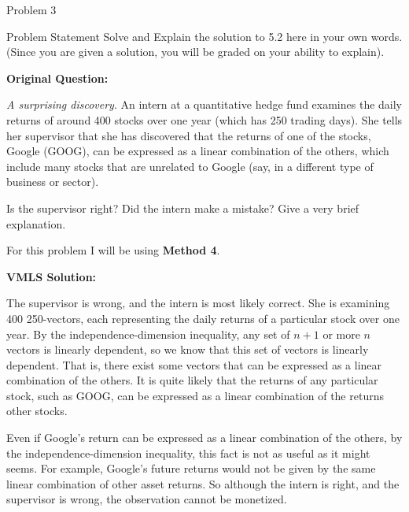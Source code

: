 \begin{problem}{Problem 3}
    \begin{statement}{Problem Statement}
        Solve and Explain the solution to 5.2 here in your own words. (Since you are given a solution, you will be graded on your ability to explain). \vspace*{1em}

        \textbf{Original Question:} \vspace*{1em}

        \textit{A surprising discovery}. An intern at a quantitative hedge fund examines the daily returns of around 400 stocks over one year (which has 250 trading days). She tells her supervisor that 
        she has discovered that the returns of one of the stocks, Google (GOOG), can be expressed as a linear combination of the others, which include many stocks that are unrelated to Google (say, in a 
        different type of business or sector).

        Is the supervisor right? Did the intern make a mistake? Give a very brief explanation.
    \end{statement}

    \begin{highlight}[Solution]
        For this problem I will be using \textbf{Method 4}. \vspace*{1em}

        \textbf{VMLS Solution:} \vspace*{1em}

        The supervisor is wrong, and the intern is most likely correct. She is examining 400 250-vectors, each representing the daily returns of a particular stock over one year. By the independence-dimension 
        inequality, any set of $n + 1$ or more $n$ vectors is linearly dependent, so we know that this set of vectors is linearly dependent. That is, there exist some vectors that can be expressed as a linear 
        combination of the others. It is quite likely that the returns of any particular stock, such as GOOG, can be expressed as a linear combination of the returns other stocks.

        Even if Google’s return can be expressed as a linear combination of the others, by the independence-dimension inequality, this fact is not as useful as it might seems. For example, Google’s future returns 
        would not be given by the same linear combination of other asset returns. So although the intern is right, and the supervisor is wrong, the observation cannot be monetized. \vspace*{1em}


\end{highlight}
\end{problem}
